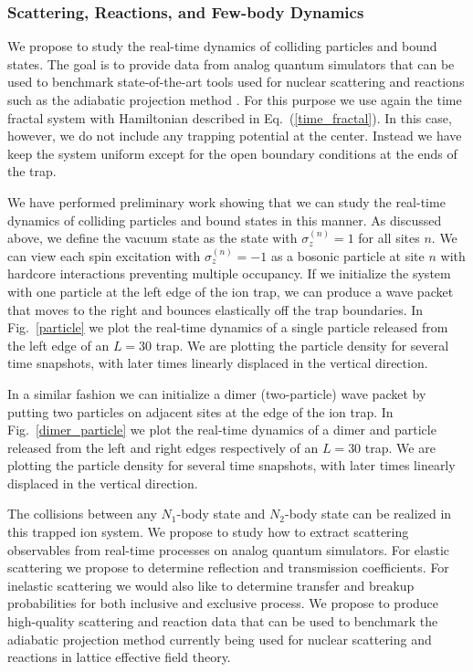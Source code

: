\documentclass[10pt]{article}
\begin{document}
\subsubsection{Scattering, Reactions, and Few-body Dynamics}

We propose to study the real-time dynamics of colliding particles and
bound states.  The goal is to provide data from analog quantum
simulators that can be used to benchmark state-of-the-art tools used
for nuclear scattering and reactions such as the adiabatic projection
method \cite{Elhatisari:2015iga}.  For this purpose we use again the
time fractal system with Hamiltonian described in
Eq.~(\ref{time_fractal}).  In this case, however, we do not include
any trapping potential at the center.  Instead we have keep the system
uniform except for the open boundary conditions at the ends of the
trap.

We have performed preliminary work showing that we can study the
real-time dynamics of colliding particles and bound states in this
manner.  As discussed above, we define the vacuum state as the state
with $\sigma_z^{(n)}=1$ for all sites $n$.  We can view each spin
excitation with $\sigma_z^{(n)}=-1$ as a bosonic particle at site $n$
with hardcore interactions preventing multiple occupancy. If we
initialize the system with one particle at the left edge of the ion
trap, we can produce a wave packet that moves to the right and bounces
elastically off the trap boundaries. In Fig.~\ref{particle} we plot
the real-time dynamics of a single particle released from the left
edge of an $L=30$ trap.  We are plotting the particle density for
several time snapshots, with later times linearly displaced in the
vertical direction.

In a similar fashion we can initialize a dimer (two-particle) wave
packet by putting two particles on adjacent sites at the edge of the
ion trap. In Fig.~\ref{dimer_particle} we plot the real-time dynamics
of a dimer and particle released from the left and right edges
respectively of an $L=30$ trap.  We are plotting the particle density
for several time snapshots, with later times linearly displaced in the
vertical direction.
 

  The collisions between any $N_1$-body state and $N_2$-body state can
  be realized in this trapped ion system.  We propose to study how to
  extract scattering observables from real-time processes on analog
  quantum simulators.  For elastic scattering we propose to determine
  reflection and transmission coefficients.  For inelastic scattering
  we would also like to determine transfer and breakup probabilities
  for both inclusive and exclusive process. We propose to produce
  high-quality scattering and reaction data that can be used to
  benchmark the adiabatic projection method currently being used for
  nuclear scattering and reactions in lattice effective field theory.
\end{document}

